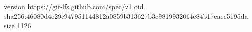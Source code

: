 version https://git-lfs.github.com/spec/v1
oid sha256:46080d4e29e947951144812a0859b313627b3c9819932064c84b17eaec5195da
size 1126
